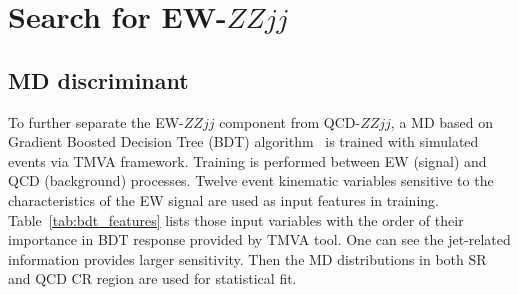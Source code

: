 \section{Search for EW-$ZZjj$}

\subsection{MD discriminant}

To further separate the EW-$ZZjj$ component from QCD-$ZZjj$, a MD based on Gradient Boosted Decision Tree (BDT) algorithm~\cite{Coadou_BDT} 
is trained with simulated events via TMVA framework\cite{Speckmayer_2010}.
Training is performed between EW (signal) and QCD (background) processes.
Twelve event kinematic variables sensitive to the characteristics of the EW signal are used as input features in training. 
Table~\ref{tab:bdt_features} lists those input variables with the order of their importance in BDT response provided by TMVA tool.
One can see the jet-related information provides larger sensitivity.
Then the MD distributions in both SR and QCD CR region are used for statistical fit.

